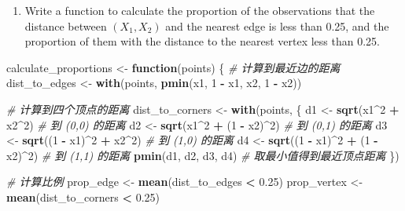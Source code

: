 \documentclass[
]{article}
\newenvironment{Shaded}{\begin{snugshade}}{\end{snugshade}}
\newcommand{\CommentTok}[1]{\textcolor[rgb]{0.56,0.35,0.01}{\textit{#1}}}
\newcommand{\ControlFlowTok}[1]{\textcolor[rgb]{0.13,0.29,0.53}{\textbf{#1}}}
\newcommand{\DecValTok}[1]{\textcolor[rgb]{0.00,0.00,0.81}{#1}}
\newcommand{\FloatTok}[1]{\textcolor[rgb]{0.00,0.00,0.81}{#1}}
\newcommand{\FunctionTok}[1]{\textcolor[rgb]{0.13,0.29,0.53}{\textbf{#1}}}
\newcommand{\NormalTok}[1]{#1}
\newcommand{\OtherTok}[1]{\textcolor[rgb]{0.56,0.35,0.01}{#1}}
\newcommand{\SpecialCharTok}[1]{\textcolor[rgb]{0.81,0.36,0.00}{\textbf{#1}}}
\providecommand{\tightlist}{%
  \setlength{\itemsep}{0pt}\setlength{\parskip}{0pt}}
\begin{document}
\begin{enumerate}
\def\labelenumi{\alph{enumi}.}
\setcounter{enumi}{1}
\tightlist
\item
  Write a function to calculate the proportion of the observations that
  the distance between \((X_1, X_2)\) and the nearest edge is less than
  0.25, and the proportion of them with the distance to the nearest
  vertex less than 0.25.
\end{enumerate}

\begin{Shaded}
\begin{Highlighting}[]
\NormalTok{calculate\_proportions }\OtherTok{\textless{}{-}} \ControlFlowTok{function}\NormalTok{(points) \{}
  \CommentTok{\# 计算到最近边的距离}
\NormalTok{  dist\_to\_edges }\OtherTok{\textless{}{-}} \FunctionTok{with}\NormalTok{(points, }\FunctionTok{pmin}\NormalTok{(x1, }\DecValTok{1} \SpecialCharTok{{-}}\NormalTok{ x1, x2, }\DecValTok{1} \SpecialCharTok{{-}}\NormalTok{ x2))}
  
  \CommentTok{\# 计算到四个顶点的距离}
\NormalTok{  dist\_to\_corners }\OtherTok{\textless{}{-}} \FunctionTok{with}\NormalTok{(points, \{}
\NormalTok{    d1 }\OtherTok{\textless{}{-}} \FunctionTok{sqrt}\NormalTok{(x1}\SpecialCharTok{\^{}}\DecValTok{2} \SpecialCharTok{+}\NormalTok{ x2}\SpecialCharTok{\^{}}\DecValTok{2}\NormalTok{)          }\CommentTok{\# 到 (0,0) 的距离}
\NormalTok{    d2 }\OtherTok{\textless{}{-}} \FunctionTok{sqrt}\NormalTok{(x1}\SpecialCharTok{\^{}}\DecValTok{2} \SpecialCharTok{+}\NormalTok{ (}\DecValTok{1} \SpecialCharTok{{-}}\NormalTok{ x2)}\SpecialCharTok{\^{}}\DecValTok{2}\NormalTok{)    }\CommentTok{\# 到 (0,1) 的距离}
\NormalTok{    d3 }\OtherTok{\textless{}{-}} \FunctionTok{sqrt}\NormalTok{((}\DecValTok{1} \SpecialCharTok{{-}}\NormalTok{ x1)}\SpecialCharTok{\^{}}\DecValTok{2} \SpecialCharTok{+}\NormalTok{ x2}\SpecialCharTok{\^{}}\DecValTok{2}\NormalTok{)    }\CommentTok{\# 到 (1,0) 的距离}
\NormalTok{    d4 }\OtherTok{\textless{}{-}} \FunctionTok{sqrt}\NormalTok{((}\DecValTok{1} \SpecialCharTok{{-}}\NormalTok{ x1)}\SpecialCharTok{\^{}}\DecValTok{2} \SpecialCharTok{+}\NormalTok{ (}\DecValTok{1} \SpecialCharTok{{-}}\NormalTok{ x2)}\SpecialCharTok{\^{}}\DecValTok{2}\NormalTok{) }\CommentTok{\# 到 (1,1) 的距离}
    \FunctionTok{pmin}\NormalTok{(d1, d2, d3, d4)             }\CommentTok{\# 取最小值得到最近顶点距离}
\NormalTok{  \})}
  
  \CommentTok{\# 计算比例}
\NormalTok{  prop\_edge }\OtherTok{\textless{}{-}} \FunctionTok{mean}\NormalTok{(dist\_to\_edges }\SpecialCharTok{\textless{}} \FloatTok{0.25}\NormalTok{)}
\NormalTok{  prop\_vertex }\OtherTok{\textless{}{-}} \FunctionTok{mean}\NormalTok{(dist\_to\_corners }\SpecialCharTok{\textless{}} \FloatTok{0.25}\NormalTok{)}
  

\end{Highlighting}
\end{Shaded}
\end{document}
